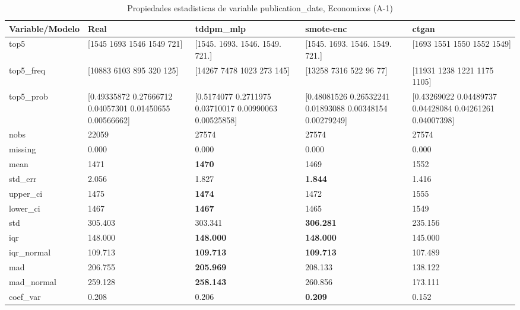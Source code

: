 \begin{table}[H]
\centering
\fontsize{8}{14}\selectfont
\caption{Propiedades  estadisticas de variable publication\_date, Economicos (A-1)}
\label{table-stats-economicos-a-1-publication_date}
\begin{tabular}{|l|m{10em}|m{10em}|m{10em}|m{10em}|}
\hline
 \rowcolor[gray]{0.8}
Variable/Modelo & Real & tddpm\_mlp & smote-enc & ctgan \\
\hline top5 & [1545 1693 1546 1549  721] & [1545. 1693. 1546. 1549.  721.] & [1545. 1693. 1546. 1549.  721.] & [1693 1551 1550 1552 1549] \\
\hline top5\_freq & [10883  6103   895   320   125] & [14267  7478  1023   273   145] & [13258  7316   522    96    77] & [11931  1238  1221  1175  1105] \\
\hline top5\_prob & [0.49335872 0.27666712 0.04057301 0.01450655 0.00566662] & [0.5174077  0.2711975  0.03710017 0.00990063 0.00525858] & [0.48081526 0.26532241 0.01893088 0.00348154 0.00279249] & [0.43269022 0.04489737 0.04428084 0.04261261 0.04007398] \\
\hline nobs & 22059 & 27574 & 27574 & 27574 \\
\hline missing & 0.000 & 0.000 & 0.000 & 0.000 \\
\hline mean & 1471 & \bfseries 1470 & 1469 & \cellcolor[rgb]{0.9, 0.54, 0.52} 1552 \\
\hline std\_err & 2.056 & 1.827 & \bfseries 1.844 & \cellcolor[rgb]{0.9, 0.54, 0.52} 1.416 \\
\hline upper\_ci & 1475 & \bfseries 1474 & 1472 & \cellcolor[rgb]{0.9, 0.54, 0.52} 1555 \\
\hline lower\_ci & 1467 & \bfseries 1467 & 1465 & \cellcolor[rgb]{0.9, 0.54, 0.52} 1549 \\
\hline std & 305.403 & 303.341 & \bfseries 306.281 & \cellcolor[rgb]{0.9, 0.54, 0.52} 235.156 \\
\hline iqr & 148.000 & \bfseries 148.000 & \bfseries 148.000 & \cellcolor[rgb]{0.9, 0.54, 0.52} 145.000 \\
\hline iqr\_normal & 109.713 & \bfseries 109.713 & \bfseries 109.713 & \cellcolor[rgb]{0.9, 0.54, 0.52} 107.489 \\
\hline mad & 206.755 & \bfseries 205.969 & 208.133 & \cellcolor[rgb]{0.9, 0.54, 0.52} 138.122 \\
\hline mad\_normal & 259.128 & \bfseries 258.143 & 260.856 & \cellcolor[rgb]{0.9, 0.54, 0.52} 173.111 \\
\hline coef\_var & 0.208 & 0.206 & \bfseries 0.209 & \cellcolor[rgb]{0.9, 0.54, 0.52} 0.152 \\

\end{tabular}
\end{table}
